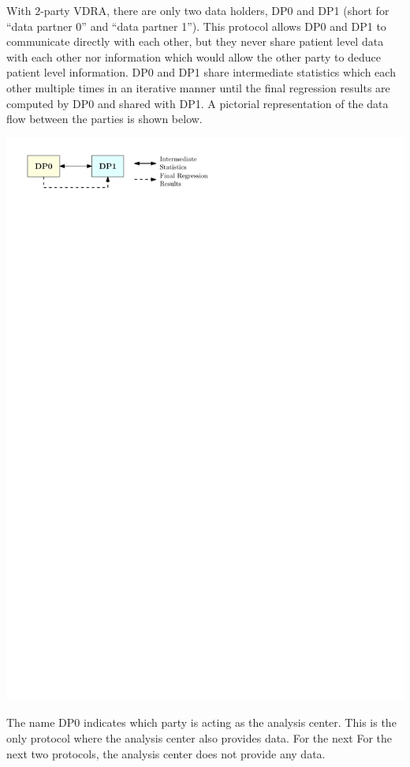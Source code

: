 \documentclass[12]{article}
\begin{document}
With $2$-party VDRA, there are only two data holders, DP0 and DP1 (short for ``data partner 0'' and ``data partner 1'').  This protocol allows DP0 and DP1 to communicate directly with each other, but they never share patient level data with each other nor information which would allow the other party to deduce patient level information.  DP0 and DP1 share intermediate statistics which each other multiple times in an iterative manner until the final regression results are computed by DP0 and shared with DP1.  A pictorial representation of the data flow between the parties is shown below.  
\begin{center}
\includegraphics[page = 1]{images.pdf}
\end{center}

The name DP0 indicates which party is acting as the analysis center.  This is the only protocol where the analysis center also provides data.  For the next For the next two protocols, the analysis center does not provide any data.
\end{document}
